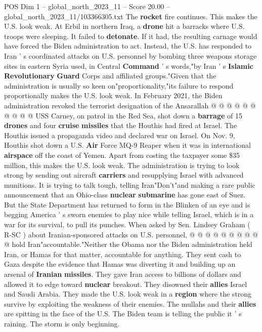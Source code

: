 \begin{textsample}{POS Dim 1 – global\_north\_2023\_11 – Score 20.00 – global\_north\_2023\_11/103366305.txt}
The \textbf{rocket} fire continues.
This makes the U.S. look weak.
At Erbil in northern Iraq, a \textbf{drone} hit a barracks where U.S. troops were sleeping.
It failed to \textbf{detonate}.
If it had, the resulting carnage would have forced the Biden administration to act.
Instead, the U.S. has responded to Iran ' s coordinated attacks on U.S. personnel by bombing three weapons storage sites in eastern Syria used, in Central \textbf{Command} ' s words,"by Iran ' s \textbf{Islamic} \textbf{Revolutionary} \textbf{Guard} Corps and affiliated groups."Given that the administration is usually so keen on"proportionality,"its failure to respond proportionally makes the U.S. look weak.
In February 2021, the Biden administration revoked the terrorist designation of the Ansarallah @ @ @ @ @ @ @ @ @ @ USS Carney, on patrol in the Red Sea, shot down a \textbf{barrage} of 15 \textbf{drones} and four \textbf{cruise} \textbf{missiles} that the Houthis had fired at Israel.
The Houthis issued a propaganda video and declared war on Israel.
On Nov. 9, Houthis shot down a U.S. \textbf{Air} Force MQ-9 Reaper when it was in international \textbf{airspace} off the coast of Yemen.
Apart from costing the taxpayer some \$35 million, this makes the U.S. look weak.
The administration is trying to look strong by sending out aircraft \textbf{carriers} and resupplying Israel with advanced munitions.
It is trying to talk tough, telling Iran"Don't"and making a rare public announcement that an Ohio-class \textbf{nuclear} \textbf{submarine} has gone east of Suez.
But the State Department has returned to form in the Blinken of an eye and is begging America ' s sworn enemies to play nice while telling Israel, which is in a war for its survival, to pull its punches.
When asked by Sen.
Lindsey Graham ( R-SC ) about Iranian-sponsored attacks on U.S. personnel, @ @ @ @ @ @ @ @ @ @ hold Iran"accountable."Neither the Obama nor the Biden administration held Iran, or Hamas for that matter, accountable for anything.
They sent cash to Gaza despite the evidence that Hamas was diverting it and building up an arsenal of \textbf{Iranian} \textbf{missiles}.
They gave Iran access to billions of dollars and allowed it to edge toward \textbf{nuclear} breakout.
They disowned their \textbf{allies} Israel and Saudi Arabia.
They made the U.S. look weak in a \textbf{region} where the strong survive by exploiting the weakness of their enemies.
The mullahs and their \textbf{allies} are spitting in the face of the U.S.
The Biden team is telling the public it ' s raining.
The storm is only beginning.

\end{textsample}
